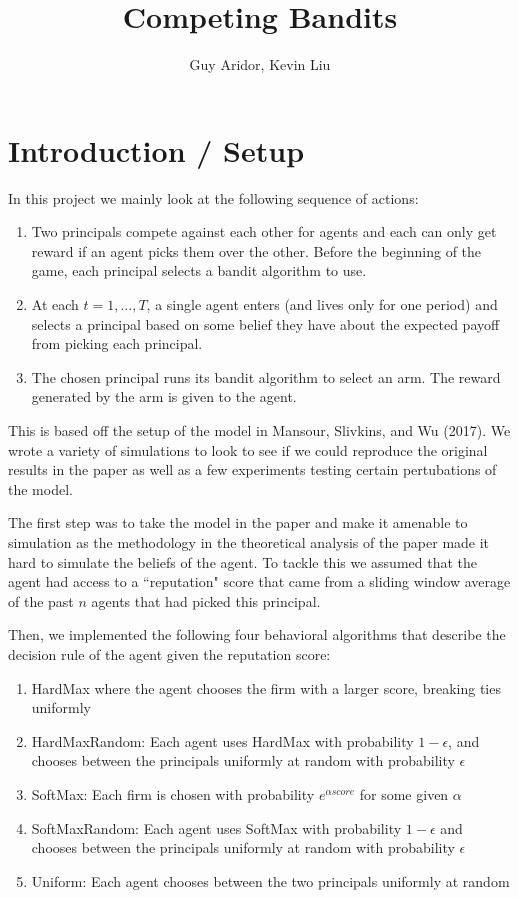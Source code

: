 \documentclass[a4paper]{article}
\begin{document}
 

\title{Competing Bandits}
\author{Guy Aridor, Kevin Liu}
\maketitle

\section*{Introduction / Setup}

In this project we mainly look at the following sequence of actions:
\begin{enumerate}
\item Two principals compete against each other for agents and each can only get reward if an agent picks them over the other. Before the beginning of the game, each principal selects a bandit algorithm to use. 
\item At each $t = 1,...,T$, a single agent enters (and lives only for one period) and selects a principal based on some belief they have about the expected payoff from picking each principal.
\item The chosen principal runs its bandit algorithm to select an arm. The reward generated by the arm is given to the agent. 
\end{enumerate}

This is based off the setup of the model in Mansour, Slivkins, and Wu (2017). We wrote a variety of simulations to look to see if we could reproduce the original results in the paper as well as a few experiments testing certain pertubations of the model.

The first step was to take the model in the paper and make it amenable to simulation as the methodology in the theoretical analysis of the paper made it hard to simulate the beliefs of the agent. To tackle this we assumed that the agent had access to a ``reputation" score that came from a sliding window average of the past $n$ agents that had picked this principal.

Then, we implemented the following four behavioral algorithms that describe the decision rule of the agent given the reputation score:
\begin{enumerate}
\item HardMax where the agent chooses the firm with a larger score, breaking ties uniformly
\item HardMaxRandom: Each agent uses HardMax with probability $1 - \epsilon$, and chooses between the principals uniformly at random with probability $\epsilon$
\item SoftMax: Each firm is chosen with probability $e^{\alpha score}$ for some given $\alpha$
\item SoftMaxRandom: Each agent uses SoftMax with probability $1 - \epsilon$ and chooses between the principals uniformly at random with probability $\epsilon$ %
\item Uniform: Each agent chooses between the two principals uniformly at random
\end{enumerate}
\end{document}
